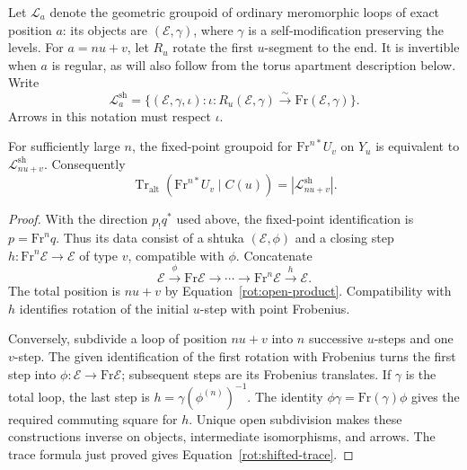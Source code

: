 Let $\mathcal L_a$ denote the geometric groupoid of ordinary meromorphic
loops of exact position $a$: its objects are $(\mathcal E,\gamma)$,
where $\gamma$ is a self-modification preserving the levels.  For
$a=nu+v$, let $R_u$ rotate the first $u$-segment to the end.  It is
invertible when $a$ is regular, as will also follow from the torus
apartment description below.  Write
\[
 \mathcal L_a^{\mathrm{sh}}
   =\{(\mathcal E,\gamma,\iota):
           \iota:R_u(\mathcal E,\gamma)
                    \xrightarrow{\sim}\mathrm{Fr}(\mathcal E,\gamma)\}.
\]
Arrows in this notation must respect $\iota$.

\begin{lemma}\label{rot:concatenation}
For sufficiently large $n$, the fixed-point groupoid for
$\mathrm{Fr}^{n*}U_v$ on $Y_u$ is equivalent to
$\mathcal L_{nu+v}^{\mathrm{sh}}$.  Consequently
\begin{equation}\label{rot:shifted-trace}
 \operatorname{Tr}_{\mathrm{alt}}(\mathrm{Fr}^{n*}U_v\mid C(u))
                  =|\mathcal L_{nu+v}^{\mathrm{sh}}|.
\end{equation}
\end{lemma}

\begin{proof}
With the direction $p_!q^*$ used above, the fixed-point identification
is $p=\mathrm{Fr}^nq$.  Thus its data consist of a shtuka
$(\mathcal E,\phi)$ and a closing step
$h:\mathrm{Fr}^n\mathcal E\to\mathcal E$ of type $v$, compatible with
$\phi$.  Concatenate
\[
 \mathcal E\xrightarrow{\phi}\mathrm{Fr}\mathcal E
       \longrightarrow\cdots\longrightarrow
 \mathrm{Fr}^n\mathcal E\xrightarrow{h}\mathcal E.
\]
The total position is $nu+v$ by Equation~\eqref{rot:open-product}.
Compatibility with $h$ identifies rotation of the initial $u$-step
with point Frobenius.

Conversely, subdivide a loop of position $nu+v$ into $n$ successive
$u$-steps and one $v$-step.  The given identification of the first
rotation with Frobenius turns the first step into
$\phi:\mathcal E\to\mathrm{Fr}\mathcal E$; subsequent steps are its
Frobenius translates.  If $\gamma$ is the total loop, the last step is
$h=\gamma(\phi^{(n)})^{-1}$.  The identity
$\phi\gamma=\mathrm{Fr}(\gamma)\phi$ gives the required commuting
square for $h$.  Unique open subdivision makes these constructions
inverse on objects, intermediate isomorphisms, and arrows.  The trace
formula just proved gives Equation~\eqref{rot:shifted-trace}.
\end{proof}

